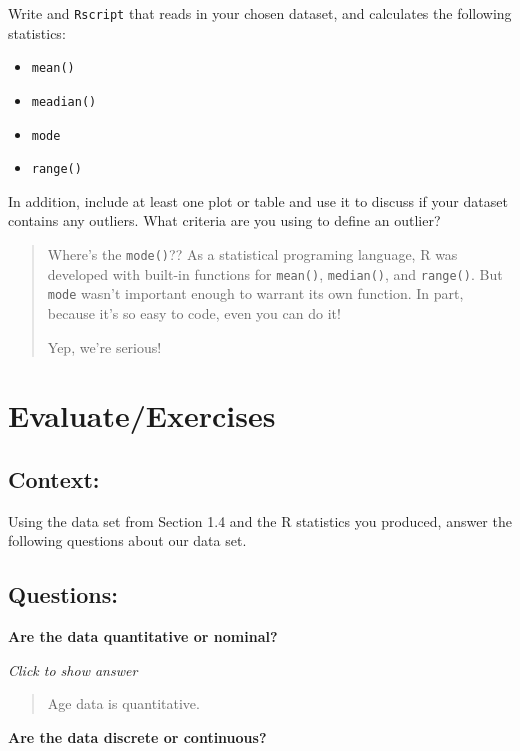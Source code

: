 \documentclass[
]{book}
\providecommand{\tightlist}{%
  \setlength{\itemsep}{0pt}\setlength{\parskip}{0pt}}
\begin{document}
Write and \texttt{Rscript} that reads in your chosen dataset, and calculates the
following statistics:

\begin{itemize}
\tightlist
\item
  \texttt{mean()}
\item
  \texttt{meadian()}
\item
  \texttt{mode}
\item
  \texttt{range()}
\end{itemize}

In addition, include at least one plot or table and use it to discuss if your dataset contains any outliers. What criteria are you using to define an outlier?

\begin{quote}
Where's the \texttt{mode()}?? As a statistical programing language, R was developed with
built-in functions for \texttt{mean()}, \texttt{median()}, and \texttt{range()}. But \texttt{mode} wasn't important
enough to warrant its own function. In part, because it's so easy to code, even you
can do it!

Yep, we're serious!
\end{quote}

\hypertarget{evaluateexercises}{%
\section{Evaluate/Exercises}\label{evaluateexercises}}

\hypertarget{context}{%
\subsection{Context:}\label{context}}

Using the data set from Section 1.4 and the R statistics you produced,
answer the following questions about our data set.

\hypertarget{questions}{%
\subsection{Questions:}\label{questions}}

\textbf{Are the data quantitative or nominal?}

\emph{Click to show answer}

\begin{quote}
Age data is quantitative.
\end{quote}

\textbf{Are the data discrete or continuous?}
\end{document}
